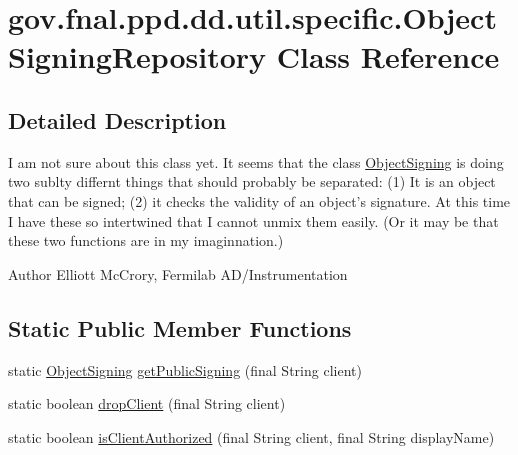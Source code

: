 \hypertarget{classgov_1_1fnal_1_1ppd_1_1dd_1_1util_1_1specific_1_1ObjectSigningRepository}{\section{gov.\-fnal.\-ppd.\-dd.\-util.\-specific.\-Object\-Signing\-Repository Class Reference}
\label{classgov_1_1fnal_1_1ppd_1_1dd_1_1util_1_1specific_1_1ObjectSigningRepository}
}


\subsection{Detailed Description}
I am not sure about this class yet. It seems that the class \hyperlink{classgov_1_1fnal_1_1ppd_1_1dd_1_1util_1_1specific_1_1ObjectSigning}{Object\-Signing} is doing two sublty differnt things that should probably be separated\-: (1) It is an object that can be signed; (2) it checks the validity of an object's signature. At this time I have these so intertwined that I cannot unmix them easily. (Or it may be that these two functions are in my imaginnation.)

\begin{DoxyAuthor}{Author}
Elliott Mc\-Crory, Fermilab A\-D/\-Instrumentation 
\end{DoxyAuthor}
\subsection*{Static Public Member Functions}
\begin{DoxyCompactItemize}
\item 
static \hyperlink{classgov_1_1fnal_1_1ppd_1_1dd_1_1util_1_1specific_1_1ObjectSigning}{Object\-Signing} \hyperlink{classgov_1_1fnal_1_1ppd_1_1dd_1_1util_1_1specific_1_1ObjectSigningRepository_a5b1c846be39df313c60ca26183a89027}{get\-Public\-Signing} (final String client)
\item 
static boolean \hyperlink{classgov_1_1fnal_1_1ppd_1_1dd_1_1util_1_1specific_1_1ObjectSigningRepository_aaa4803138869f8eb5ff005c8fa6ca820}{drop\-Client} (final String client)
\item 
static boolean \hyperlink{classgov_1_1fnal_1_1ppd_1_1dd_1_1util_1_1specific_1_1ObjectSigningRepository_a222eaa12e64386f9d0712169468b6412}{is\-Client\-Authorized} (final String client, final String display\-Name)
\end{DoxyCompactItemize}


